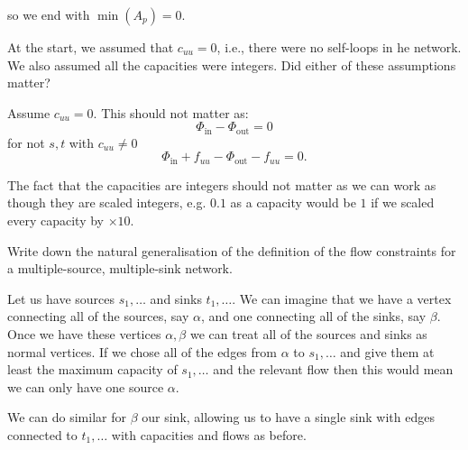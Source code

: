 \documentclass[10pt, a4paper]{article}
\begin{document}
\begin{example}
\begin{figure}[H]
    \end{figure}
    so we end with $\min(A_p) = 0$.
\end{example}

\begin{example}
    At the start,
    we assumed that $c_{uu} = 0$,
    i.e.,
    there were no self-loops in he network.
    We also assumed all the capacities were integers.
    Did either of these assumptions matter?

    \begin{solution}
        Assume $c_{uu} = 0$.
        This should not matter as:
        \[
        \Phi_{\text{in}} - \Phi_{\text{out}} = 0
        \]
        for not $s, t$ with $c_{uu} \neq 0$
        \[
        \Phi_{\text{in}} + f_{uu} - \Phi_{\text{out}} - f_{uu} = 0.
        \]

        The fact that the capacities are integers should not matter as we can work as though they are scaled integers,
        e.g. $0.1$ as a capacity would be $1$ if we scaled every capacity by $\times 10$.
    \end{solution}
\end{example}

\begin{example}
    Write down the natural generalisation of the definition of the flow constraints for a multiple-source,
    multiple-sink network.

    \begin{solution}
        Let us have sources $s_1, \dotsc$ and sinks $t_1, \dotsc$.
        We can imagine that we have a vertex connecting all of the sources,
        say $\alpha$,
        and one connecting all of the sinks,
        say $\beta$.
        Once we have these vertices $\alpha, \beta$ we can treat all of the sources and sinks as normal vertices.
        If we chose all of the edges from $\alpha$ to $s_1, \dotsc$ and give them at least the maximum capacity of $s_1, \dotsc$ and the relevant flow then this would mean we can only have one source $\alpha$.

        We can do similar for $\beta$ our sink,
        allowing us to have a single sink with edges connected to $t_1, \dotsc$ with capacities and flows as before.
    \end{solution}
\end{example}
\end{document}
